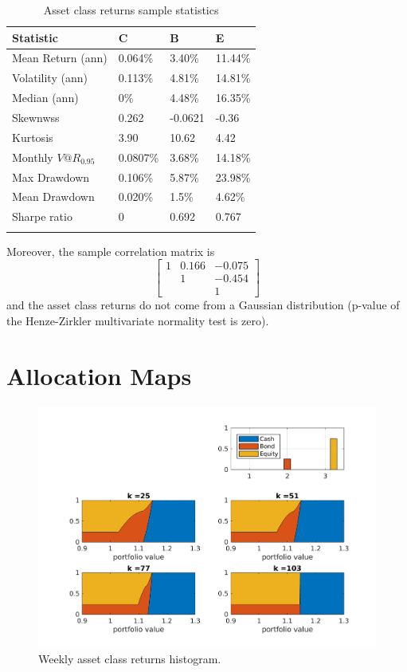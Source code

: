 \begin{table}[H]\label{tab:sampleStatistics}
	\centering
	\begin{tabular}{@{}llll@{}} \toprule
		Statistic & C & B & E \\ \midrule
		Mean Return (ann) & 0.064\%  & 3.40\% & 11.44\%\\
		\addlinespace[0.5em]
		Volatility (ann) & 0.113\%  & 4.81\% & 14.81\% \\
		\addlinespace[0.5em]
		Median (ann) &	0\% & 4.48\% & 16.35\% \\
		\addlinespace[0.5em]
		Skewnwss & 0.262 & -0.0621 & -0.36 \\
		\addlinespace[0.5em]
		Kurtosis & 3.90 & 10.62 & 4.42 \\
		\addlinespace[0.5em]
		Monthly $V@R_{0.95}$ & 0.0807\% & 3.68\% & 14.18\%\\
		\addlinespace[0.5em]
		Max Drawdown & 0.106\% & 5.87\% & 23.98\% \\
		\addlinespace[0.5em]
		Mean Drawdown & 0.020\% & 1.5\% & 4.62\% \\
		\addlinespace[0.5em]
		Sharpe ratio & 0 & 0.692 & 0.767 \\ \bottomrule
		\addlinespace[0.5em]
	\end{tabular}
	\caption{Asset class returns sample statistics}
\end{table}
Moreover, the sample correlation matrix is  
\[ 
\begin{bmatrix}
1 & 0.166 & -0.075 \\
  &  1    & -0.454 \\
  &       &  1
\end{bmatrix}
\]
and the asset class returns do not come from a Gaussian distribution (p-value of the Henze-Zirkler multivariate normality test is zero).
\section{Allocation Maps}\label{sec:Allocation_Maps}

\begin{figure}[h]
	\centering
	\includegraphics[scale = 0.9]{Images/mapsMixturewk.png}
	\caption{Weekly asset class returns histogram.}
\end{figure}


